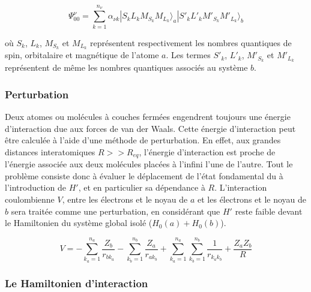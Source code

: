 \documentclass[12pt,a4paper]{book}
\begin{document}
	\begin{equation}
	\Psi_{00}^{\nu} = \sum_{k=1}^{n_{\nu}} \alpha_{\nu k}| S_{k} L_{k} M_{S_{k}} M_{L_{k}} \rangle _{a} | S'_{k} L'_{k} M'_{S_{k}} M'_{L_{k}} \rangle _{b}
	\end{equation}
	
	\noindent où $S_{k}$, $L_{k}$, $M_{S_{k}}$ et $M_{L_{k}}$ représentent respectivement les nombres quantiques de spin, orbitalaire et magnétique de l'atome $a$. Les termes $S'_{k}$, $L'_{k}$, $M'_{S_{k}}$ et $M'_{L_{k}}$ représentent de même les nombres quantiques associés au système $b$.
	
	\subsubsection{Perturbation}
	
	Deux atomes ou molécules à couches fermées engendrent toujours une énergie d'interaction due aux forces de van der Waals. Cette énergie d'interaction peut être calculée à l'aide d'une méthode de perturbation. En effet, aux grandes distances interatomiques $R>>R_{eq}$, l'énergie d'interaction est proche de l'énergie associée aux deux molécules placées à l'infini l'une de l'autre.  
	Tout le problème consiste donc à évaluer le déplacement de l'état fondamental du à l'introduction de $H'$, et en particulier sa dépendance à $R$. L'interaction coulombienne $V$, entre les électrons et le noyau de $a$ et les électrons et le noyau de $b$ sera traitée comme une perturbation, en considérant que $H'$ reste faible devant le Hamiltonien du système global isolé ($H_{0}(a)+ H_{0}(b)$). 
	
	
	\begin{equation}
	V = - \sum_{k_{a}=1}^{n_{a}} \frac{Z_{b}}{r_{bk_{a}}} - \sum_{k_{b}=1}^{n_{b}} \frac{Z_{a}}{r_{ak_{b}}} + \sum_{k_{a}=1}^{n_{a}} \sum_{k_{b}=1}^{n_{b}} \frac{1}{r_{k_{a}k_{b}}} + \frac{Z_{a} Z_{b}}{R}
	\end{equation}
	
	\subsubsection{Le Hamiltonien d'interaction}
	
\end{document}
